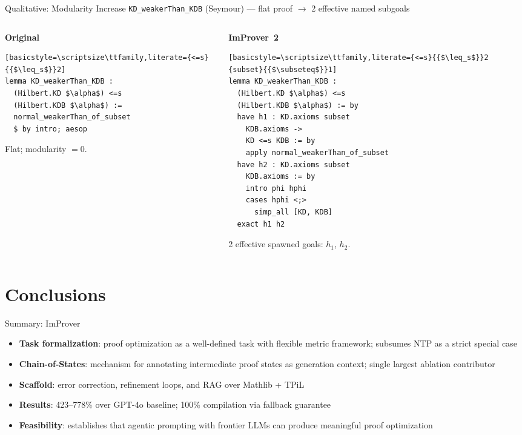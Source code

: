 \begin{frame}[fragile]{Qualitative: Modularity Increase}
\vspace{0.2em}
{\small \texttt{KD\_weakerThan\_KDB} (Seymour) --- flat proof $\to$ 2 effective named subgoals}
\begin{columns}[T]
\begin{column}{0.40\textwidth}
\textbf{Original}
\begin{lstlisting}[basicstyle=\scriptsize\ttfamily,literate={<=s}{{$\leq_s$}}2]
lemma KD_weakerThan_KDB :
  (Hilbert.KD $\alpha$) <=s
  (Hilbert.KDB $\alpha$) :=
  normal_weakerThan_of_subset
  $ by intro; aesop
\end{lstlisting}
\small Flat; modularity $= 0$.
\end{column}
\begin{column}{0.57\textwidth}
\textbf{ImProver~2}
\begin{lstlisting}[basicstyle=\scriptsize\ttfamily,literate={<=s}{{$\leq_s$}}2 {subset}{{$\subseteq$}}1]
lemma KD_weakerThan_KDB :
  (Hilbert.KD $\alpha$) <=s
  (Hilbert.KDB $\alpha$) := by
  have h1 : KD.axioms subset
    KDB.axioms ->
    KD <=s KDB := by
    apply normal_weakerThan_of_subset
  have h2 : KD.axioms subset
    KDB.axioms := by
    intro phi hphi
    cases hphi <;>
      simp_all [KD, KDB]
  exact h1 h2
\end{lstlisting}
\small 2 effective spawned goals: $h_1$, $h_2$.
\end{column}
\end{columns}
\end{frame}

\section{Conclusions}

\begin{frame}{Summary: ImProver}
\vspace{0.5em}
\begin{itemize}\setlength{\itemsep}{8pt}
  \item \textbf{Task formalization}: proof optimization as a well-defined task with flexible metric framework; subsumes NTP as a strict special case
  \item \textbf{Chain-of-States}: mechanism for annotating intermediate proof states as generation context; single largest ablation contributor
  \item \textbf{Scaffold}: error correction, refinement loops, and RAG over Mathlib + TPiL
  \item \textbf{Results}: 423--778\% over GPT-4o baseline; 100\% compilation via fallback guarantee
  \item \textbf{Feasibility}: establishes that agentic prompting with frontier LLMs can produce meaningful proof optimization
\end{itemize}
\end{frame}

